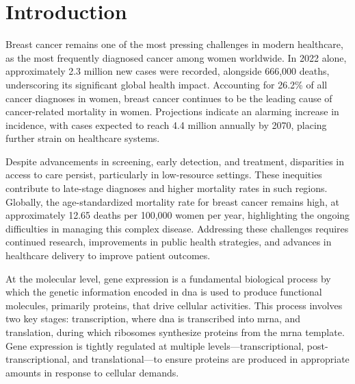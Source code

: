 \chapter{Introduction}

Breast cancer remains one of the most pressing challenges in modern healthcare,
as the most frequently diagnosed cancer among women worldwide.
In 2022 alone, approximately 2.3 million new cases were recorded, alongside
666,000 deaths, underscoring its significant global health impact.
Accounting for 26.2\% of all cancer diagnoses in
women\supercite{bray_global_2024,ferlay_global_2024}, breast cancer continues
to be the leading cause of cancer-related mortality in women.
Projections indicate an alarming increase in incidence, with cases expected to
reach 4.4 million annually by 2070, placing further strain on healthcare
systems\supercite{lei_global_2021}.

Despite advancements in screening, early detection, and treatment, disparities
in access to care persist, particularly in low-resource settings.
These inequities contribute to late-stage diagnoses and higher mortality rates
in such regions\supercite{wilkinson_understanding_2022,ginsburg_breast_2020}.
Globally, the age-standardized mortality rate for breast cancer remains high,
at approximately 12.65 deaths per 100,000 women per year, highlighting the
ongoing difficulties in managing this complex
disease\supercite{bray_global_2024,ferlay_global_2024}.
Addressing these challenges requires continued research, improvements in public
health strategies, and advances in healthcare delivery to improve patient
outcomes\supercite{desantis_breast_2019}.

At the molecular level, gene expression is a fundamental biological process by
which the genetic information encoded in \gls{dna} is used to produce
functional molecules, primarily proteins, that drive cellular
activities\supercite{salmena_cerna_2011}.
This process involves two key stages: transcription, where \gls{dna} is
transcribed into \gls{mrna}, and translation, during which ribosomes synthesize
proteins from the \gls{mrna}
template\supercite{salmena_cerna_2011,tay_multilayered_2014}.
Gene expression is tightly regulated at multiple levels—transcriptional,
post-transcriptional, and translational—to ensure proteins are produced in
appropriate amounts in response to cellular
demands\supercite{poliseno_coding-independent_2010,tay_multilayered_2014}.

